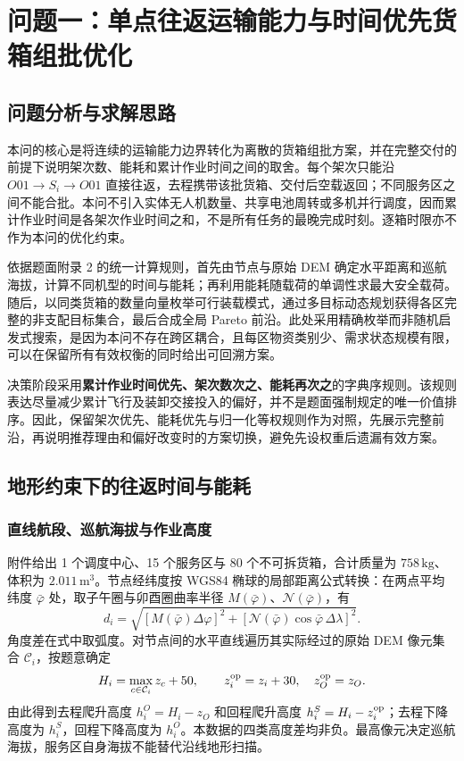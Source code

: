 \section{问题一：单点往返运输能力与时间优先货箱组批优化}
\label{sec:q1}

\subsection{问题分析与求解思路}

本问的核心是将连续的运输能力边界转化为离散的货箱组批方案，并在完整交付的前提下说明架次数、能耗和累计作业时间之间的取舍。每个架次只能沿 $O01\to S_i\to O01$ 直接往返，去程携带该批货箱、交付后空载返回；不同服务区之间不能合批。本问不引入实体无人机数量、共享电池周转或多机并行调度，因而累计作业时间是各架次作业时间之和，不是所有任务的最晚完成时刻。逐箱时限亦不作为本问的优化约束。

依据题面附录 2 的统一计算规则，首先由节点与原始 DEM 确定水平距离和巡航海拔，计算不同机型的时间与能耗；再利用能耗随载荷的单调性求最大安全载荷。随后，以同类货箱的数量向量枚举可行装载模式，通过多目标动态规划获得各区完整的非支配目标集合，最后合成全局 Pareto 前沿。此处采用精确枚举而非随机启发式搜索，是因为本问不存在跨区耦合，且每区物资类别少、需求状态规模有限，可以在保留所有有效权衡的同时给出可回溯方案。

决策阶段采用\textbf{累计作业时间优先、架次数次之、能耗再次之}的字典序规则。该规则表达尽量减少累计飞行及装卸交接投入的偏好，并不是题面强制规定的唯一价值排序。因此，保留架次优先、能耗优先与归一化等权规则作为对照，先展示完整前沿，再说明推荐理由和偏好改变时的方案切换，避免先设权重后遗漏有效方案。

\subsection{地形约束下的往返时间与能耗}
\subsubsection{直线航段、巡航海拔与作业高度}

附件给出 1 个调度中心、15 个服务区与 80 个不可拆货箱，合计质量为 $758\,\mathrm{kg}$、体积为 $2.011\,\mathrm{m^3}$。节点经纬度按 WGS84 椭球的局部距离公式转换：在两点平均纬度 $\bar\varphi$ 处，取子午圈与卯酉圈曲率半径 $M(\bar\varphi)$、$\mathcal N(\bar\varphi)$，有
\begin{equation}
 d_i=\sqrt{[M(\bar\varphi)\Delta\varphi]^2+
 [\mathcal N(\bar\varphi)\cos\bar\varphi\,\Delta\lambda]^2}.
 \label{eq:q1-distance}
\end{equation}
角度差在式中取弧度。对节点间的水平直线遍历其实际经过的原始 DEM 像元集合 $\mathcal C_i$，按题意确定
\begin{equation}
 H_i=\max_{c\in\mathcal C_i}z_c+50,
 \qquad z_i^{\rm op}=z_i+30,\quad z_O^{\rm op}=z_O.
 \label{eq:q1-height}
\end{equation}
由此得到去程爬升高度 $h_i^O=H_i-z_O$ 和回程爬升高度 $h_i^S=H_i-z_i^{\rm op}$；去程下降高度为 $h_i^S$，回程下降高度为 $h_i^O$。本数据的四类高度差均非负。最高像元决定巡航海拔，服务区自身海拔不能替代沿线地形扫描。

